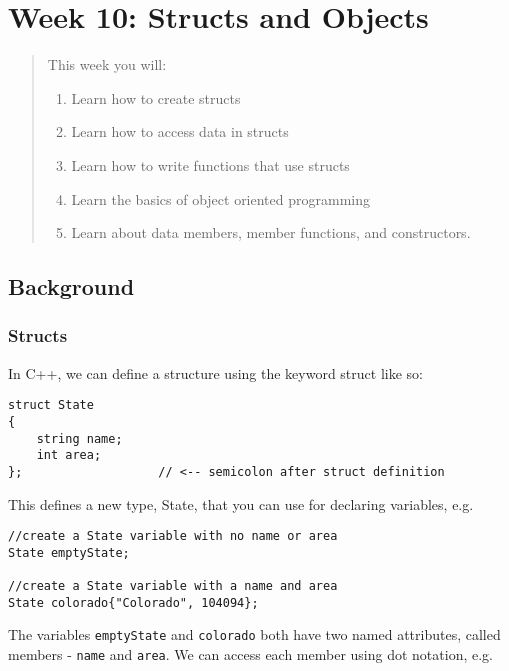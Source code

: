 \chapter*{Week 10: Structs and Objects}
\setcounter{chapter}{11}
\setcounter{section}{0}

\begin{abstract}
This week you will:
\begin{enumerate}
    \item Learn how to create structs
    \item Learn how to access data in structs
    \item Learn how to write functions that use structs
    \item Learn the basics of object oriented programming
    \item Learn about data members, member functions, and constructors.

\end{enumerate}
    
\end{abstract}

\section{Background}
\subsection{Structs}

In C++, we can define a structure using the keyword struct like so:

\begin{verbatim}
struct State
{
    string name;
    int area;
};                   // <-- semicolon after struct definition
\end{verbatim}

This defines a new type, State, that you can use for declaring variables, e.g.

\begin{verbatim}
//create a State variable with no name or area
State emptyState;

//create a State variable with a name and area
State colorado{"Colorado", 104094};
\end{verbatim}

The variables \texttt{emptyState} and \texttt{colorado} both have two named attributes, called members - \texttt{name} and \texttt{area}. We can access each member using dot notation, e.g.

